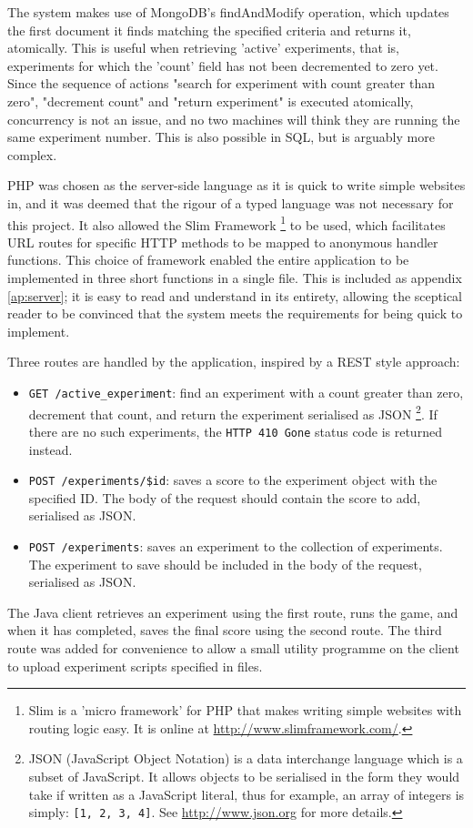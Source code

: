 
The system makes use of MongoDB's findAndModify operation, which updates the first document it finds matching the specified criteria and returns it, atomically.  This is useful when retrieving 'active' experiments, that is, experiments for which the 'count' field has not been decremented to zero yet.  Since the sequence of actions "search for experiment with count greater than zero", "decrement count" and "return experiment" is executed atomically, concurrency is not an issue, and no two machines will think they are running the same experiment number.  This is also possible in SQL, but is arguably more complex.

PHP was chosen as the server-side language as it is quick to write simple websites in, and it was deemed that the rigour of a typed language was not necessary for this project.  It also allowed the Slim Framework \footnote{Slim is a 'micro framework' for PHP that makes writing simple websites with routing logic easy.  It is online at \url{http://www.slimframework.com/}.} to be used, which facilitates URL routes for specific HTTP methods to be mapped to anonymous handler functions.  This choice of framework enabled the entire application to be implemented in three short functions in a single file.  This is included as appendix \ref{ap:server}; it is easy to read and understand in its entirety, allowing the sceptical reader to be convinced that the system meets the requirements for being quick to implement.

Three routes are handled by the application, inspired by a REST style approach:

\begin{itemize}
\item {\tt GET /active\_experiment}: find an experiment with a count greater than zero, decrement that count, and return the experiment serialised as JSON \footnote{JSON (JavaScript Object Notation) is a data interchange language which is a subset of JavaScript.  It allows objects to be serialised in the form they would take if written as a JavaScript literal, thus for example, an array of integers is simply: {\tt [1, 2, 3, 4]}.  See \url{http://www.json.org} for more details.}.  If there are no such experiments, the {\tt HTTP 410 Gone} status code is returned instead.
\item {\tt POST /experiments/\$id}: saves a score to the experiment object with the specified ID.  The body of the request should contain the score to add, serialised as JSON.
\item {\tt POST /experiments}: saves an experiment to the collection of experiments.  The experiment to save should be included in the body of the request, serialised as JSON.
\end{itemize}

The Java client retrieves an experiment using the first route, runs the game, and when it has completed, saves the final score using the second route.  The third route was added for convenience to allow a small utility programme on the client to upload experiment scripts specified in files.



